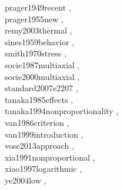 \documentclass{article}
\begin{document}
prager1949recent \cite{prager1949recent}, \\
prager1955new \cite{prager1955new}, \\
remy2003thermal \cite{remy2003thermal}, \\
sines1959behavior \cite{sines1959behavior}, \\
smith1970stress \cite{smith1970stress}, \\
socie1987multiaxial \cite{socie1987multiaxial}, \\
socie2000multiaxial \cite{socie2000multiaxial}, \\
standard2007e2207 \cite{standard2007e2207}, \\
tanaka1985effects \cite{tanaka1985effects}, \\
tanaka1994nonproportionality \cite{tanaka1994nonproportionality}, \\
van1986criterion \cite{van1986criterion}, \\
van1999introduction \cite{van1999introduction}, \\
vose2013approach \cite{vose2013approach}, \\
xia1991nonproportional \cite{xia1991nonproportional}, \\
xiao1997logarithmic \cite{xiao1997logarithmic}, \\
ye2004low \cite{ye2004low}, \\

\end{document}
